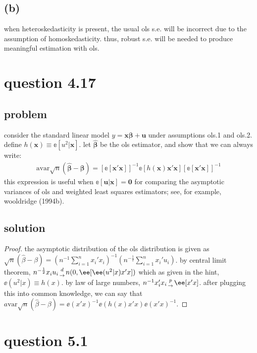 \documentclass[10pt, a4paper]{article}
\newcommand{\var}{\text{var}}
\begin{document}
      \subsection*{(b)}
        when heteroskedasticity is present, the usual ols s.e. will be incorrect due to the assumption of homoskedasticity. thus, robust s.e. will be needed to produce meaningful estimation with ols.
  \section*{question 4.17}
    \subsection*{problem}
      consider the standard linear model $y = \boldsymbol{x}\boldsymbol{\beta} + \boldsymbol{u}$ under assumptions ols.1 and ols.2. define $h(\boldsymbol{x}) \equiv \mathbb{e}[u^2 | \boldsymbol{x}]$. let $\hat{\boldsymbol{\beta}}$ be the ols estimator, and show that we can always write:
      \begin{align}
      \text{avar}\sqrt{n}(\hat{\boldsymbol{\beta}} - \boldsymbol{\beta}) = \left[\mathbb{e}[\boldsymbol{x}'\boldsymbol{x}]\right]^{-1} \mathbb{e}[h(\boldsymbol{x})\boldsymbol{x}'\boldsymbol{x}]\left[\mathbb{e}[\boldsymbol{x}'\boldsymbol{x}]\right]^{-1}
      \end{align}
      this expression is useful when $\mathbb{e}[\boldsymbol{u} | \boldsymbol{x}] = \boldsymbol{0}$ for comparing the asymptotic variances of ols and weighted least squares estimators; see, for example, wooldridge (1994b).
    \subsection*{solution}
      \begin{proof}
        the asymptotic distribution of the ols distribution is given as $\sqrt{n}(\hat{\beta}-\beta) = (n^{-1}\sum\limits_{i=1}^nx_i'x_i)^{-1}(n^{-\frac{1}{2}}\sum\limits_{i=1}^nx_i'u_i)$. by central limit theorem, $n^{-\frac{1}{2}}x_iu_i {d\atop{\rightarrow}} n(0,\ee[\ee(u^2|x)x'x])$ which as given in the hint, $\ee(u^2|x) \equiv h(x)$. by law of large numbers, $n^{-1}x_i'x_i {p\atop{\rightarrow}}\ee[x'x]$. after plugging this into common knowledge, we can say that $a\var\sqrt{n}(\hat{\beta}-\beta) = \ee(x'x)^{-1}\ee(h(x)x'x)\ee(x'x)^{-1}$. 
      \end{proof}
  \section*{question 5.1}
\end{document}
